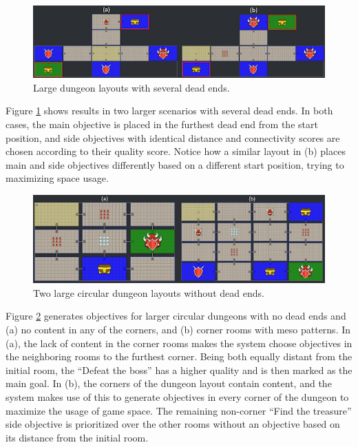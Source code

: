 \begin{figure}[h]
  \centering
  \includegraphics[width=\columnwidth]{included-papers-tex/paper-7/figures/results4.png}
  \caption{Large dungeon layouts with several dead ends.}
  \label{fig:oldfig8}
\end{figure}

Figure \ref{fig:oldfig8} shows results in two larger scenarios with several dead ends. In both cases, the main objective is placed in the furthest dead end from the start position, and side objectives with identical distance and connectivity scores are chosen according to their quality score. Notice how a similar layout in (b) places main and side objectives differently based on a different start position, trying to maximizing space usage.

\begin{figure}[h]
  \centering
  \includegraphics[width=\columnwidth]{included-papers-tex/paper-7/figures/results5.png}
  \caption{Two large circular dungeon layouts without dead ends.}
  \label{fig:oldfig9}
\end{figure}

Figure \ref{fig:oldfig9} generates objectives for larger circular dungeons with no dead ends and (a) no content in any of the corners, and (b) corner rooms with meso patterns. In (a), the lack of content in the corner rooms makes the system choose objectives in the neighboring rooms to the furthest corner. Being both equally distant from the initial room, the “Defeat the boss” has a higher quality and is then marked as the main goal. In (b), the corners of the dungeon layout contain content, and the system makes use of this to generate objectives in every corner of the dungeon to maximize the usage of game space. The remaining non-corner “Find the treasure” side objective is prioritized over the other rooms without an objective based on its distance from the initial room.

